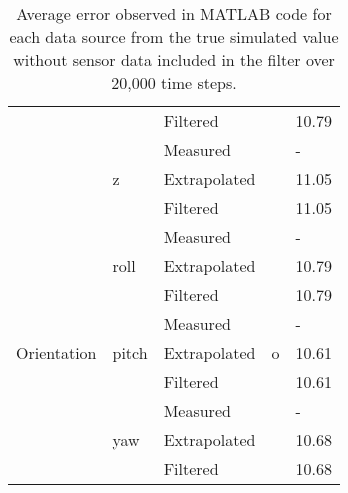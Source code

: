 \begin{table}[ht]
\begin{tabular}{@{}cllcl@{}}
                                              &                        & Filtered     &                           & 10.79          \\
                                              & \multirow{3}{*}{z}     & Measured     &                           & -        \\
                                              &                        & Extrapolated &                           & 11.05          \\
                                              &                        & Filtered     &                           & 11.05          \\ \midrule
\multirow{9}{*}{Orientation}                  & \multirow{3}{*}{roll}  & Measured     & \multirow{9}{*}{o}        & -          \\
                                              &                        & Extrapolated &                           & 10.79          \\
                                              &                        & Filtered     &                           & 10.79          \\
                                              & \multirow{3}{*}{pitch} & Measured     &                           & -          \\
                                              &                        & Extrapolated &                           & 10.61          \\
                                              &                        & Filtered     &                           & 10.61          \\
                                              & \multirow{3}{*}{yaw}   & Measured     &                           & -          \\
                                              &                        & Extrapolated &                           & 10.68          \\
                                              &                        & Filtered     &                           & 10.68          \\ \midrule
\end{tabular}
\caption{Average error observed in MATLAB code for each data source from the true simulated value without sensor data included in the filter over 20,000 time steps. }
\label{tab:rawvaluesnosensordouble}
\end{table}


